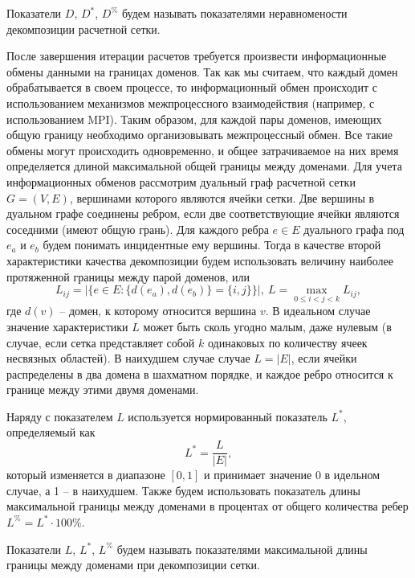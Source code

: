 \begin{definition}
Показатели $D$, $D^{*}$, $D^{\%}$ будем называть показателями неравномености декомпозиции расчетной сетки.
\end{definition} 

После завершения итерации расчетов требуется произвести информационные обмены данными на границах доменов.
Так как мы считаем, что каждый домен обрабатывается в своем процессе, то информационный обмен происходит с использованием механизмов межпроцессного взаимодействия (например, с использованием MPI).
Таким образом, для каждой пары доменов, имеющих общую границу необходимо организовывать межпроцессный обмен.
Все такие обмены могут происходить одновременно, и общее затрачиваемое на них время определяется длиной максимальной общей границы между доменами.
Для учета информационных обменов рассмотрим дуальный граф расчетной сетки $G = (V, E)$, вершинами которого являются ячейки сетки.
Две вершины в дуальном графе соединены ребром, если две соответствующие ячейки являются соседними (имеют общую грань).
Для каждого ребра $e \in E$ дуального графа под $e_a$ и $e_b$ будем понимать инцидентные ему вершины.
Тогда в качестве второй характеристики качества декомпозиции будем использовать величину наиболее протяженной границы между парой доменов, или
\begin{equation}
L_{ij} = \left| \{ e \in E: \{ d(e_a), d(e_b) \} = \{ i, j \} \} \right|, \ L = \max_{0 \le i < j < k}{L_{ij}},
\end{equation}
где $d(v)$ -- домен, к которому относится вершина $v$.
В идеальном случае значение характеристики $L$ может быть сколь угодно малым, даже нулевым (в случае, если сетка представляет собой $k$ одинаковых по количеству ячеек несвязных областей).
В наихудшем случае случае $L = |E|$, если ячейки распределены в два домена в шахматном порядке, и каждое ребро относится к границе между этими двумя доменами.

Наряду с показателем $L$ используется нормированный показатель $L^{*}$, определяемый как
\begin{equation}
	L^{*} = \frac{L}{|E|},
\end{equation}
который изменяется в диапазоне $[0, 1]$ и принимает значение 0 в идельном случае, а 1 -- в наихудшем.
Также будем использовать показатель длины максимальной границы между доменами в процентах от общего количества ребер $L^{\%} = L^{*} \cdot 100\%$.

\begin{definition}
Показатели $L$, $L^{*}$, $L^{\%}$ будем называть показателями максимальной длины границы между доменами при декомпозиции сетки.
\end{definition}

